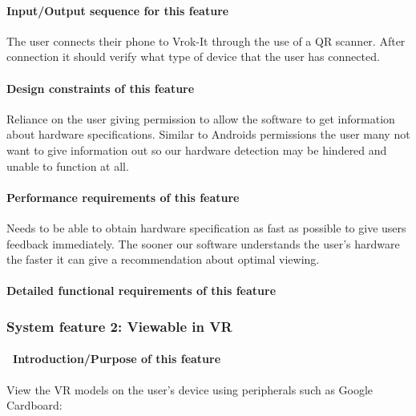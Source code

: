 \documentclass[letterpaper, 10pt, draftclsnofoot, onecolumn]{IEEEtran}
\begin{document}
{\paragraph[Input/Output sequence for this
feature]{\rmfamily\bfseries\color{black}
Input/Output sequence for this feature}
{\color{black}
The user connects their phone to Vrok-It through the use of a QR scanner. After connection it should verify what type of device that the user has connected. }

\paragraph[Design constraints of this
feature]{\rmfamily\bfseries\color{black} Design
constraints of this feature}
{\color{black}
Reliance on the user giving permission to allow the software to get information about hardware specifications. Similar to Androids permissions the user many not want to give information out so our hardware detection may be hindered and unable to function at all. }

\paragraph[Performance requirements of this
feature]{\rmfamily\bfseries\color{black}
Performance requirements of this feature}
{\color{black}
Needs to be able to obtain hardware specification as fast as possible to give users feedback immediately. The sooner our software understands the user's hardware the faster it can give a recommendation about optimal viewing. }

\paragraph[Detailed functional requirements of this
feature]{\rmfamily\bfseries\color{black}
Detailed functional requirements of this feature}




\subsubsection[{Viewable VR Models}]{\rmfamily\bfseries\color{black} System
feature 2: Viewable in VR}
\paragraph[\ Introduction/Purpose of this
feature]{\foreignlanguage{english}{\ }\foreignlanguage{english}{Introduction/Purpose
of this feature}}
{\color{black}
View the VR models on the user's device using peripherals such as Google Cardboard:   }

}
\end{document}
